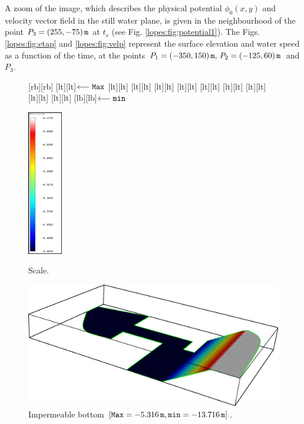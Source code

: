  A zoom of the image, which  describes
the physical potential \(\phi_0(x,y)\) and velocity vector field in the still
water plane, is given in  the neighbourhood of  the
point \(P_3=(255,-75)\,{\tt m}\) at \(t_s\) (see
Fig. \ref{lopes:fig:potential1}).
The Figs. \ref{lopes:fig:etap} and \ref{lopes:fig:velp} represent
 the surface elevation and water speed as a function of the
 time, at the
points \(P_1=(-350, 150)\,{\tt m},\, P_2=(-125,60)\,{\tt
m}\) and \(P_3\).
\begin{figure}[!htb]
\begin{minipage}[t]{0.3\linewidth}
[rb][rb]{}
[lt][lt]{\(\longleftarrow\tt Max\)}
[lt][lt]{}
[lt][lt]{}
[lt][lt]{}
[lt][lt]{}
[lt][lt]{}
[lt][lt]{}
[lt][lt]{}
[lt][lt]{}
[lt][lt]{}
[lb][lb]{\(\longleftarrow\tt min\)}
{\centering
\includegraphics[width=1.5cm]{chapters/lopes/eps/table.eps}
\caption{Scale.}\label{lopes:fig:scale}\par}
\end{minipage}\hfill
\begin{minipage}[t]{0.7\linewidth}
{\centering
\includegraphics[width=\largewidth]{chapters/lopes/eps/depth.eps}
\caption{Impermeable bottom \newline \([{\tt Max}=-5.316\,{\tt m},{\tt min}=-13.716\,{\tt m}]\).}
\label{lopes:fig:harbour_depth}\par}
\end{minipage}
\end{figure}
